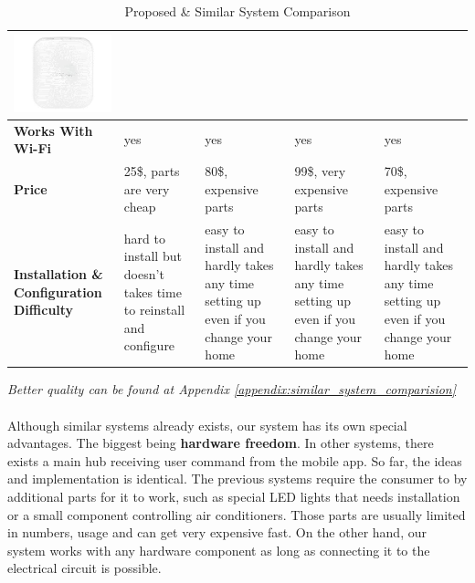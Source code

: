 \documentclass[12pt, oneside, a4paper]{book}
\newcommand\boldcolor[1]{\textcolor{bold}{\textbf{#1}}}
\begin{document}
\begin{table}[H]
\begin{center}
\begin{tabularx}{1\linewidth}{|m{2.2cm}*4{|X}|}
						\includegraphics[width=\linewidth]{img/samsung_hw.png}
					 \\\hline
					\boldcolor{Works With Wi-Fi} & yes & yes & yes & yes  \\\hline

					\boldcolor{Price} & 25\$, parts are very cheap & 80\$, expensive parts & 99\$, very expensive parts & 70\$, expensive parts \\\hline
					
					\boldcolor{Installation \& Configuration Difficulty} & hard to install but doesn't takes time to reinstall and configure& easy to install and hardly takes any time setting up even if you change your home  & easy to install and hardly takes any time setting up even if you change your home  & easy to install and hardly takes any time setting up even if you change your home
					\\\hline
				\end{tabularx}
			\end{center}
			\caption{Proposed \& Similar System Comparison}
		\end{table}
		\textit{Better quality can be found at Appendix \ref{appendix:similar_system_comparision}}
		\newpage
		\paragraph{} Although similar systems already exists, our system has its own special advantages. The biggest being \textbf{hardware freedom}. In other systems, there exists a main hub receiving user command from the mobile app. So far, the ideas and implementation is identical. The previous systems require the consumer to by additional parts for it to work, such as special LED lights that needs installation or a small component controlling air conditioners. Those parts are usually limited in numbers, usage and can get very expensive fast. On the other hand, our system works with any hardware component as long as connecting it to the electrical circuit is possible.
\end{document}
